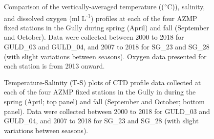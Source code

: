 \documentclass[12pt]{article}\usepackage[]{graphicx}\usepackage[]{color}
\begin{document}
\begin{landscapepage}
\begin{figure}[htb]

{\centering {} 

}

\caption{Comparison of the vertically-averaged temperature ((\(\degree\)C)), salinity, and dissolved oxygen (ml L\textsuperscript{-1}) profiles at each of the four AZMP fixed stations in the Gully during spring (April) and fall (September and October). Data were collected between 2000 to 2018 for GULD\_03 and GULD\_04, and 2007 to 2018 for SG\_23 and SG\_28 (with slight variations between seasons). Oxygen data presented for each station is from 2013 onward.}\label{fig:figure8}
\end{figure}
\end{landscapepage}
\clearpage


\begin{landscapepage}
\begin{figure}[htb]

{\centering {} 

}

\caption{Temperature-Salinity (T-S) plots of CTD profile data collected at each of the four AZMP fixed stations in the Gully in during the spring (April; top panel) and fall (September and October; bottom panel). Data were collected between 2000 to 2018 for GULD\_03 and GULD\_04, and 2007 to 2018 for SG\_23 and SG\_28 (with slight variations between seasons).}\label{fig:figure9}
\end{figure}
\end{landscapepage}
\clearpage
\end{document}
